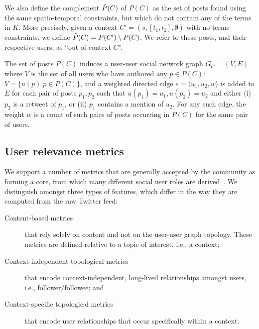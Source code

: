 We also define the complement $\Tilde{P}(C)$ of $P(C)$ as the set of posts found using the same spatio-temporal constraints, but which do not contain any of the terms in $K$. More precisely, given a context $C'= ( s, [t_1, t_2], \emptyset )$ with no terms constraints, we define $\Tilde{P}(C) = P(C') \setminus P(C)$. 
We refer to these posts, and their respective users, as ``out of context $C$''.

The set of posts $P(C)$ induces a user-user social network graph $G_C = (V,E)$ where $V$ is the set of all users who have authored any $p \in P(C)$: 
$V = \{ u(p) | p \in P(C) \}$, and a weighted directed edge $e = \langle u_1, u_2, w \rangle$ is added to $E$ for each pair of posts $p_1, p_2$ such that $u(p_1) = u_1, u(p_2) = u_2$ and 
either (i) $p_2$ is a retweet of $p_1$, or (ii) $p_1$ contains a mention of $u_2$.
For any such edge, the weight $w$ is a count of such pairs of posts occurring in $P(C)$ for the same pair of users.

\subsection{User relevance metrics}  \label{sec:metrics}

We support a number of metrics that are generally accepted by the community as forming a core, from which many different social user roles are derived~\cite{RIQUELME2016949}. 
We distinguish amongst three types of features, which differ in the way they are computed from the raw Twitter feed:
\begin{description}
	\item[Content-based metrics] that rely solely on content and not on the user-user graph topology. These metrics are defined relative to a topic of interest, i.e., a context;
	\item[Context-independent topological metrics] that encode context-independent, long-lived relationships amongst users, i.e., follower/followee; and 
	\item[Context-specific topological metrics] that encode user relationships that occur specifically within a context.
\end{description}

